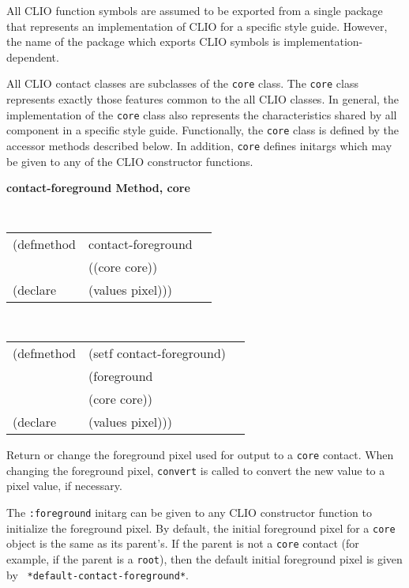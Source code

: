 All CLIO function symbols are assumed to be exported from a single package that
represents an implementation of CLIO for a specific style guide. However, the
name of the package which exports CLIO symbols is implementation-dependent. 



 
All CLIO contact classes are subclasses of the {\tt core} class.  The {\tt core}
class represents exactly those features common to the all CLIO classes. In
general, the implementation of the {\tt core} class also represents the
characteristics shared by all component in a specific style guide.
Functionally, the {\tt core} class is defined by the accessor methods described
below.  In addition, {\tt core} defines initargs which may be given to any of
the CLIO constructor functions.

{\samepage
{\large {\bf contact-foreground \hfill Method, core}}
\begin{flushright} \parbox[t]{6.125in}{
\tt
\begin{tabular}{lll}
\raggedright
(defmethod & contact-foreground & \\
& ((core  core)) \\
(declare & (values pixel)))
\end{tabular}
\rm

}\end{flushright}}

{\samepage
\begin{flushright} \parbox[t]{6.125in}{
\tt
\begin{tabular}{lll}
\raggedright
(defmethod & (setf contact-foreground) & \\
         & (foreground \\
         & (core core)) \\
(declare & (values pixel)))
\end{tabular}
\rm
}
\end{flushright}}



\begin{flushright} \parbox[t]{6.125in}{
Return or change the foreground pixel used for output to a {\tt core}
contact. When changing the foreground pixel, {\tt convert}
is called to convert the new value to a pixel value, if necessary.

The {\tt :foreground} initarg can be given to any CLIO constructor
function to initialize the foreground pixel.  By default, the initial
foreground pixel for a {\tt core} object is the same as its parent's.
If the parent is not a {\tt core} contact (for example, if the parent is
a {\tt root}), then the default initial foreground pixel is given by
{\tt {}
*default-contact-foreground*}.

}\end{flushright}

